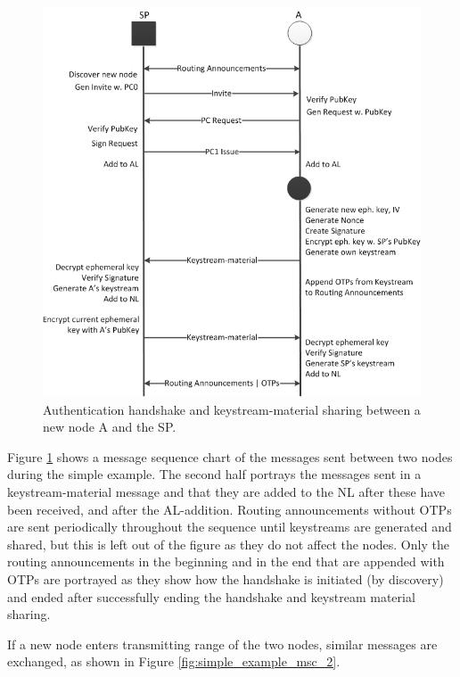 \begin{figure}[ht!]
	\centering
  	\includegraphics[width=\textwidth]{images/simple_example_msc.png}
  	\caption{Authentication handshake and keystream-material sharing between a
  	new node A and the SP.}
	\label{fig:simple_example_msc}
\end{figure}

Figure \ref{fig:simple_example_msc} shows a message sequence chart of the
messages sent between two nodes during the simple example. The second
half portrays the messages sent in a keystream-material message and that
they are added to the \ac{NL} after these have been received, and after
the \ac{AL}-addition. Routing announcements without \aclp{OTP} are sent
periodically throughout the sequence until keystreams are generated and shared,
but this is left out of the figure as they do not affect the nodes. Only the
routing announcements in the beginning and in the end that are appended with
\acp{OTP} are portrayed as they show how the handshake is initiated (by
discovery) and ended after successfully ending the handshake and keystream
material sharing.

If a new node enters transmitting range of the two nodes, similar messages are
exchanged, as shown in Figure \ref{fig:simple_example_msc_2}.

